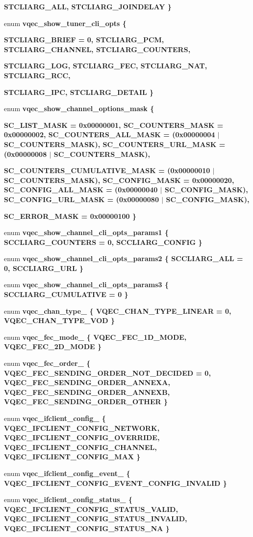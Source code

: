 \begin{CompactItemize}
\bf{STCLIARG\_\-ALL}, 
\bf{STCLIARG\_\-JOINDELAY}
 \}
\item 
enum \bf{vqec\_\-show\_\-tuner\_\-cli\_\-opts} \{ \par
\bf{STCLIARG\_\-BRIEF} =  0, 
\bf{STCLIARG\_\-PCM}, 
\bf{STCLIARG\_\-CHANNEL}, 
\bf{STCLIARG\_\-COUNTERS}, 
\par
\bf{STCLIARG\_\-LOG}, 
\bf{STCLIARG\_\-FEC}, 
\bf{STCLIARG\_\-NAT}, 
\bf{STCLIARG\_\-RCC}, 
\par
\bf{STCLIARG\_\-IPC}, 
\bf{STCLIARG\_\-DETAIL}
 \}
\item 
enum \bf{vqec\_\-show\_\-channel\_\-options\_\-mask} \{ \par
\bf{SC\_\-LIST\_\-MASK} =  0x00000001, 
\bf{SC\_\-COUNTERS\_\-MASK} =  0x00000002, 
\bf{SC\_\-COUNTERS\_\-ALL\_\-MASK} =  (0x00000004 $|$ SC\_\-COUNTERS\_\-MASK), 
\bf{SC\_\-COUNTERS\_\-URL\_\-MASK} =  (0x00000008 $|$ SC\_\-COUNTERS\_\-MASK), 
\par
\bf{SC\_\-COUNTERS\_\-CUMULATIVE\_\-MASK} =  (0x00000010 $|$ SC\_\-COUNTERS\_\-MASK), 
\bf{SC\_\-CONFIG\_\-MASK} =  0x00000020, 
\bf{SC\_\-CONFIG\_\-ALL\_\-MASK} =  (0x00000040 $|$ SC\_\-CONFIG\_\-MASK), 
\bf{SC\_\-CONFIG\_\-URL\_\-MASK} =  (0x00000080 $|$ SC\_\-CONFIG\_\-MASK), 
\par
\bf{SC\_\-ERROR\_\-MASK} =  0x00000100
 \}
\item 
enum \bf{vqec\_\-show\_\-channel\_\-cli\_\-opts\_\-params1} \{ \bf{SCCLIARG\_\-COUNTERS} =  0, 
\bf{SCCLIARG\_\-CONFIG}
 \}
\item 
enum \bf{vqec\_\-show\_\-channel\_\-cli\_\-opts\_\-params2} \{ \bf{SCCLIARG\_\-ALL} =  0, 
\bf{SCCLIARG\_\-URL}
 \}
\item 
enum \bf{vqec\_\-show\_\-channel\_\-cli\_\-opts\_\-params3} \{ \bf{SCCLIARG\_\-CUMULATIVE} =  0
 \}
\item 
enum \bf{vqec\_\-chan\_\-type\_\-} \{ \bf{VQEC\_\-CHAN\_\-TYPE\_\-LINEAR} =  0, 
\bf{VQEC\_\-CHAN\_\-TYPE\_\-VOD}
 \}
\item 
enum \bf{vqec\_\-fec\_\-mode\_\-} \{ \bf{VQEC\_\-FEC\_\-1D\_\-MODE}, 
\bf{VQEC\_\-FEC\_\-2D\_\-MODE}
 \}
\item 
enum \bf{vqec\_\-fec\_\-order\_\-} \{ \bf{VQEC\_\-FEC\_\-SENDING\_\-ORDER\_\-NOT\_\-DECIDED} =  0, 
\bf{VQEC\_\-FEC\_\-SENDING\_\-ORDER\_\-ANNEXA}, 
\bf{VQEC\_\-FEC\_\-SENDING\_\-ORDER\_\-ANNEXB}, 
\bf{VQEC\_\-FEC\_\-SENDING\_\-ORDER\_\-OTHER}
 \}
\item 
enum \bf{vqec\_\-ifclient\_\-config\_\-} \{ \bf{VQEC\_\-IFCLIENT\_\-CONFIG\_\-NETWORK}, 
\bf{VQEC\_\-IFCLIENT\_\-CONFIG\_\-OVERRIDE}, 
\bf{VQEC\_\-IFCLIENT\_\-CONFIG\_\-CHANNEL}, 
\bf{VQEC\_\-IFCLIENT\_\-CONFIG\_\-MAX}
 \}
\item 
enum \bf{vqec\_\-ifclient\_\-config\_\-event\_\-} \{ \bf{VQEC\_\-IFCLIENT\_\-CONFIG\_\-EVENT\_\-CONFIG\_\-INVALID}
 \}
\item 
enum \bf{vqec\_\-ifclient\_\-config\_\-status\_\-} \{ \bf{VQEC\_\-IFCLIENT\_\-CONFIG\_\-STATUS\_\-VALID}, 
\bf{VQEC\_\-IFCLIENT\_\-CONFIG\_\-STATUS\_\-INVALID}, 
\bf{VQEC\_\-IFCLIENT\_\-CONFIG\_\-STATUS\_\-NA}
 \}
\end{CompactItemize}
